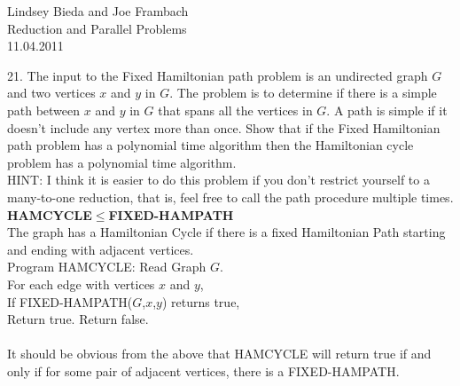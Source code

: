 \documentclass[10pt]{article}
\newcommand{\tab}{\hspace*{2em}}
\newcommand{\tabb}{\hspace*{4em}}
\newcommand{\tabbb}{\hspace*{6em}}
\begin{document}
	\begin{flushright}
	Lindsey Bieda and Joe Frambach\\
	Reduction and Parallel Problems\\
	11.04.2011
	\end{flushright}

21. The input to the Fixed Hamiltonian path problem is an undirected graph $G$ and two vertices $x$ and $y$
in $G$. The problem is to determine if there is a simple path between $x$ and $y$ in $G$ that spans all the
vertices in $G$. A path is simple if it doesn't include any vertex more than once. Show that if the Fixed
Hamiltonian path problem has a polynomial time algorithm then the Hamiltonian cycle problem has
a polynomial time algorithm.\\
HINT: I think it is easier to do this problem if you don't restrict yourself to a many-to-one reduction,
that is, feel free to call the path procedure multiple times.
\\
\textbf{HAMCYCLE}$\leq$\textbf{FIXED-HAMPATH}\\
The graph has a Hamiltonian Cycle if there is a fixed Hamiltonian Path starting and ending with adjacent vertices.\\
Program HAMCYCLE:
\tab Read Graph $G$.\\
\tab For each edge with vertices $x$ and $y$,\\
\tabb If FIXED-HAMPATH($G$,$x$,$y$) returns true,\\
\tabbb Return true.
\tab Return false.\\
\\
It should be obvious from the above that HAMCYCLE will return true if and only if for some pair of adjacent vertices,
there is a FIXED-HAMPATH.
\end{document}
